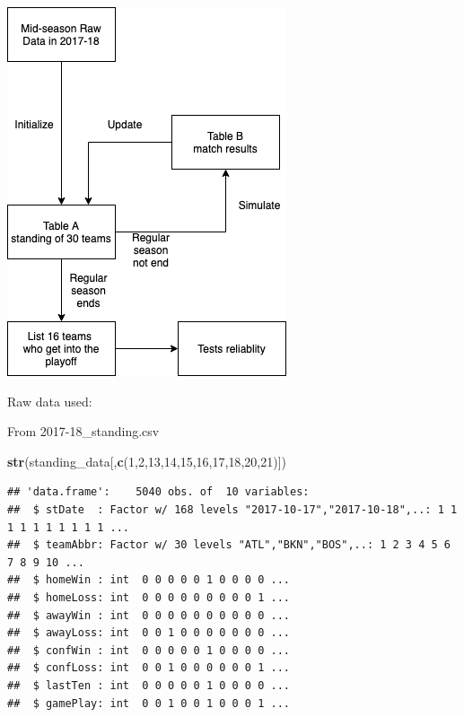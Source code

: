 \documentclass[]{article}
\newenvironment{Shaded}{\begin{snugshade}}{\end{snugshade}}
\newcommand{\DecValTok}[1]{\textcolor[rgb]{0.00,0.00,0.81}{#1}}
\newcommand{\KeywordTok}[1]{\textcolor[rgb]{0.13,0.29,0.53}{\textbf{#1}}}
\newcommand{\NormalTok}[1]{#1}
\newcommand{\KeywordTok}[1]{\textcolor[rgb]{0.13,0.29,0.53}{\textbf{#1}}}
\newcommand{\DecValTok}[1]{\textcolor[rgb]{0.00,0.00,0.81}{#1}}
\newcommand{\NormalTok}[1]{#1}
\begin{document}
\begin{center}\includegraphics{methods_flowchart} \end{center}

Raw data used:

From 2017-18\_standing.csv

\begin{Shaded}
\begin{Highlighting}[]
\KeywordTok{str}\NormalTok{(standing_data[,}\KeywordTok{c}\NormalTok{(}\DecValTok{1}\NormalTok{,}\DecValTok{2}\NormalTok{,}\DecValTok{13}\NormalTok{,}\DecValTok{14}\NormalTok{,}\DecValTok{15}\NormalTok{,}\DecValTok{16}\NormalTok{,}\DecValTok{17}\NormalTok{,}\DecValTok{18}\NormalTok{,}\DecValTok{20}\NormalTok{,}\DecValTok{21}\NormalTok{)])}
\end{Highlighting}
\end{Shaded}

\begin{verbatim}
## 'data.frame':    5040 obs. of  10 variables:
##  $ stDate  : Factor w/ 168 levels "2017-10-17","2017-10-18",..: 1 1 1 1 1 1 1 1 1 1 ...
##  $ teamAbbr: Factor w/ 30 levels "ATL","BKN","BOS",..: 1 2 3 4 5 6 7 8 9 10 ...
##  $ homeWin : int  0 0 0 0 0 1 0 0 0 0 ...
##  $ homeLoss: int  0 0 0 0 0 0 0 0 0 1 ...
##  $ awayWin : int  0 0 0 0 0 0 0 0 0 0 ...
##  $ awayLoss: int  0 0 1 0 0 0 0 0 0 0 ...
##  $ confWin : int  0 0 0 0 0 1 0 0 0 0 ...
##  $ confLoss: int  0 0 1 0 0 0 0 0 0 1 ...
##  $ lastTen : int  0 0 0 0 0 1 0 0 0 0 ...
##  $ gamePlay: int  0 0 1 0 0 1 0 0 0 1 ...
\end{verbatim}
\end{document}
